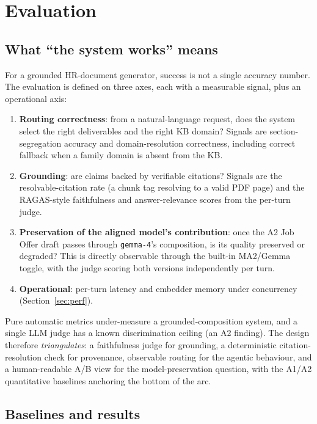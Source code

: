 \section{Evaluation}
\label{sec:eval}

\subsection{What ``the system works'' means}

For a grounded HR-document generator, success is not a single accuracy number. The
evaluation is defined on three axes, each with a measurable signal, plus an operational
axis:

\begin{enumerate}
  \item \textbf{Routing correctness}: from a natural-language request, does the system
    select the right deliverables and the right KB domain? Signals are section-segregation
    accuracy and domain-resolution correctness, including correct fallback when a family
    domain is absent from the KB.
  \item \textbf{Grounding}: are claims backed by verifiable citations? Signals are the
    resolvable-citation rate (a chunk tag resolving to a valid PDF page) and the
    RAGAS-style faithfulness and answer-relevance scores from the per-turn judge.
  \item \textbf{Preservation of the aligned model's contribution}: once the A2 Job Offer
    draft passes through \verb|gemma-4|'s composition, is its quality preserved or
    degraded? This is directly observable through the built-in MA2/Gemma toggle, with the
    judge scoring both versions independently per turn.
  \item \textbf{Operational}: per-turn latency and embedder memory under concurrency
    (Section~\ref{sec:perf}).
\end{enumerate}

Pure automatic metrics under-measure a grounded-composition system, and a single LLM judge
has a known discrimination ceiling (an A2 finding). The design therefore
\emph{triangulates}: a faithfulness judge for grounding, a deterministic
citation-resolution check for provenance, observable routing for the agentic behaviour, and
a human-readable A/B view for the model-preservation question, with the A1/A2 quantitative
baselines anchoring the bottom of the arc.

\subsection{Baselines and results}

